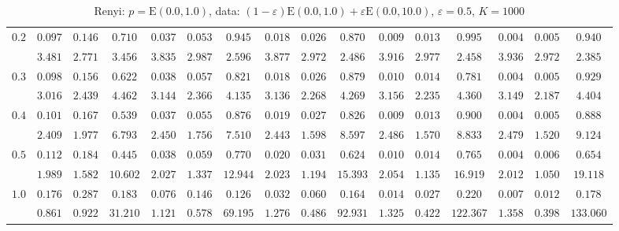 \begin{table}[ht]
\begin{center}
\begin{tabular}{|c|ccc|ccc|ccc|ccc|ccc|}
\hline 
$0.2$ & $ 0.097 $ & $ 0.146 $ & $ 0.710 $ & $ 0.037 $ & $ 0.053 $ & $ 0.945 $ & $ 0.018 $ & $ 0.026 $ & $ 0.870 $ & $ 0.009 $ & $ 0.013 $ & $ 0.995 $ & $ 0.004 $ & $ 0.005 $ & $ 0.940 $\\ 
 & $ 3.481 $ & $ 2.771 $ & $ 3.456 $ & $ 3.835 $ & $ 2.987 $ & $ 2.596 $ & $ 3.877 $ & $ 2.972 $ & $ 2.486 $ & $ 3.916 $ & $ 2.977 $ & $ 2.458 $ & $ 3.936 $ & $ 2.972 $ & $ 2.385 $\\ 
\hline 
$0.3$ & $ 0.098 $ & $ 0.156 $ & $ 0.622 $ & $ 0.038 $ & $ 0.057 $ & $ 0.821 $ & $ 0.018 $ & $ 0.026 $ & $ 0.879 $ & $ 0.010 $ & $ 0.014 $ & $ 0.781 $ & $ 0.004 $ & $ 0.005 $ & $ 0.929 $\\ 
 & $ 3.016 $ & $ 2.439 $ & $ 4.462 $ & $ 3.144 $ & $ 2.366 $ & $ 4.135 $ & $ 3.136 $ & $ 2.268 $ & $ 4.269 $ & $ 3.156 $ & $ 2.235 $ & $ 4.360 $ & $ 3.149 $ & $ 2.187 $ & $ 4.404 $\\ 
\hline 
$0.4$ & $ 0.101 $ & $ 0.167 $ & $ 0.539 $ & $ 0.037 $ & $ 0.055 $ & $ 0.876 $ & $ 0.019 $ & $ 0.027 $ & $ 0.826 $ & $ 0.009 $ & $ 0.013 $ & $ 0.900 $ & $ 0.004 $ & $ 0.005 $ & $ 0.888 $\\ 
 & $ 2.409 $ & $ 1.977 $ & $ 6.793 $ & $ 2.450 $ & $ 1.756 $ & $ 7.510 $ & $ 2.443 $ & $ 1.598 $ & $ 8.597 $ & $ 2.486 $ & $ 1.570 $ & $ 8.833 $ & $ 2.479 $ & $ 1.520 $ & $ 9.124 $\\ 
\hline 
$0.5$ & $ 0.112 $ & $ 0.184 $ & $ 0.445 $ & $ 0.038 $ & $ 0.059 $ & $ 0.770 $ & $ 0.020 $ & $ 0.031 $ & $ 0.624 $ & $ 0.010 $ & $ 0.014 $ & $ 0.765 $ & $ 0.004 $ & $ 0.006 $ & $ 0.654 $\\ 
 & $ 1.989 $ & $ 1.582 $ & $ 10.602 $ & $ 2.027 $ & $ 1.337 $ & $ 12.944 $ & $ 2.023 $ & $ 1.194 $ & $ 15.393 $ & $ 2.054 $ & $ 1.135 $ & $ 16.919 $ & $ 2.012 $ & $ 1.050 $ & $ 19.118 $\\ 
\hline 
$1.0$ & $ 0.176 $ & $ 0.287 $ & $ 0.183 $ & $ 0.076 $ & $ 0.146 $ & $ 0.126 $ & $ 0.032 $ & $ 0.060 $ & $ 0.164 $ & $ 0.014 $ & $ 0.027 $ & $ 0.220 $ & $ 0.007 $ & $ 0.012 $ & $ 0.178 $\\ 
 & $ 0.861 $ & $ 0.922 $ & $ 31.210 $ & $ 1.121 $ & $ 0.578 $ & $ 69.195 $ & $ 1.276 $ & $ 0.486 $ & $ 92.931 $ & $ 1.325 $ & $ 0.422 $ & $ 122.367 $ & $ 1.358 $ & $ 0.398 $ & $ 133.060 $\\ 
\hline 
\end{tabular}
\caption{Renyi: $p = \mathrm{E}(0.0,1.0)$, data: $(1-\varepsilon)\mathrm{E}(0.0,1.0) + \varepsilon \mathrm{E}(0.0,10.0)$, $\varepsilon =  0.5$, $K = 1000$} 
\label{tab:MDE6}
\end{center}

\end{table}
%
